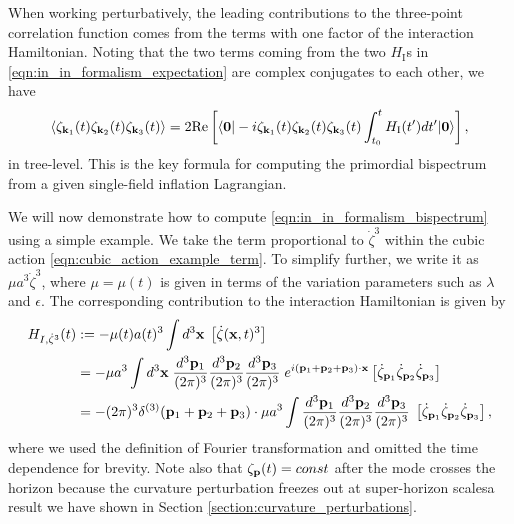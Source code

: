 When working perturbatively, the leading contributions to the three-point correlation function comes from the terms with one factor of the interaction Hamiltonian. Noting that the two terms coming from the two $H_\text{I}$s in \eqref{eqn:in_in_formalism_expectation} are complex conjugates to each other, we have
\begin{align}
	\left< \zeta_{\mathbf{k}_1}(t) \zeta_{\mathbf{k}_2}(t) \zeta_{\mathbf{k}_3}(t) \right> = 2 \text{Re}\left[ \langle\mathbf{0}| -i \zeta_{\mathbf{k}_1}(t) \zeta_{\mathbf{k}_2}(t) \zeta_{\mathbf{k}_3}(t) \int_{t_0}^{t} H_\text{I}(t') dt' |\mathbf{0}\rangle \right], \label{eqn:in_in_formalism_bispectrum}
\end{align}
in tree-level. This is the key formula for computing the primordial bispectrum from a given single-field inflation Lagrangian.

We will now demonstrate how to compute \eqref{eqn:in_in_formalism_bispectrum} using a simple example. We take the term proportional to $\dot\zeta^3$ within the cubic action \eqref{eqn:cubic_action_example_term}. To simplify further, we write it as $\mu a^3 \dot{\zeta}^3$, where $\mu=\mu(t)$ is given in terms of the variation parameters such as $\lambda$ and $\epsilon$. The corresponding contribution to the interaction Hamiltonian is given by
\begin{align}
	H_{I,\dot{\zeta}^3}(t) &:= -\mu(t) a(t)^3 \int d^3\mathbf{x} \; \left[  \dot{\zeta}(\mathbf{x},t)^3 \right]  \\
	&= -\mu a^3 \int d^3\mathbf{x} \; \frac{d^3\mathbf{p}_1}{(2\pi)^3} \frac{d^3\mathbf{p}_2}{(2\pi)^3} \frac{d^3\mathbf{p}_3}{(2\pi)^3} \; e^{i(\mathbf{p}_1 + \mathbf{p}_2 + \mathbf{p}_3)\cdot\mathbf{x}} \left[ \dot{\zeta}_{\mathbf{p}_1} \dot{\zeta}_{\mathbf{p}_2} \dot{\zeta}_{\mathbf{p}_3} \right] \\
	&= - (2\pi)^3 \delta^{(3)}(\mathbf{p}_1 + \mathbf{p}_2 + \mathbf{p}_3) \cdot \mu a^3 \int \frac{d^3\mathbf{p}_1}{(2\pi)^3} \frac{d^3\mathbf{p}_2}{(2\pi)^3} \frac{d^3\mathbf{p}_3}{(2\pi)^3} \; \left[ \dot{\zeta}_{\mathbf{p}_1} \dot{\zeta}_{\mathbf{p}_2} \dot{\zeta}_{\mathbf{p}_3} \right], \label{def:interaction_hamiltonian_zeta_dot_cube}
\end{align}
where we used the definition of Fourier transformation and omitted the time dependence for brevity. Note also that $\zeta_{\mathbf{p}}(t) = const$ after the mode crosses the horizon because the curvature perturbation freezes out at super-horizon scales\textemdash a result we have shown in Section \ref{section:curvature_perturbations}.

